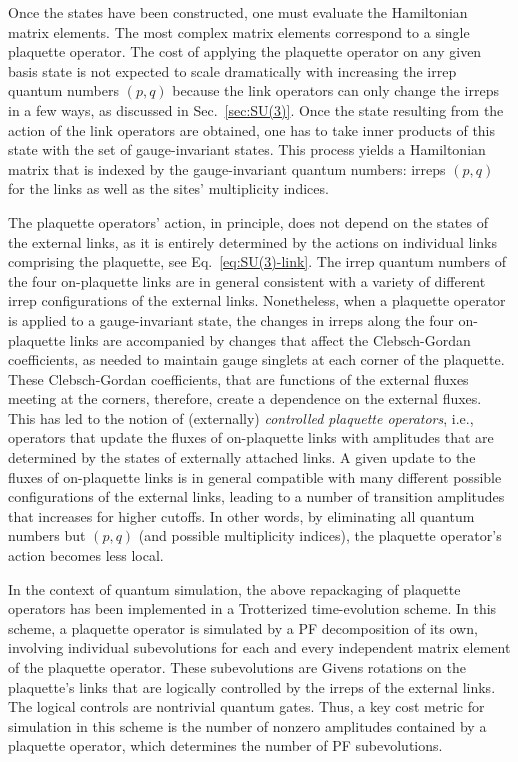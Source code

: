 \documentclass[aps,prd,twocolumn,showpacs,groupedaddress,superscriptaddress,nofootinbib,floatfix,preprintnumbers,longbibliography]{revtex4-1}
\begin{document}
Once the states have been constructed, one must evaluate the Hamiltonian matrix elements. The most complex matrix elements correspond to a single plaquette operator. The cost of applying the plaquette operator on any given basis state is not expected to scale dramatically with increasing the irrep quantum numbers $(p,q)$ because the link operators can only change the irreps in a few ways, as discussed in Sec.~\ref{sec:SU(3)}. Once the state resulting from the action of the link operators are obtained, one has to take inner products of this state with the set of gauge-invariant states. This process yields a Hamiltonian matrix that is indexed by the gauge-invariant quantum numbers: irreps $(p,q)$ for the links as well as the sites' multiplicity indices.

The plaquette operators' action, in principle, does not depend on the states of the external links, as it is entirely determined by the actions on individual links comprising the plaquette, see Eq.~\eqref{eq:SU(3)-link}. The irrep quantum numbers of the four on-plaquette links are in general consistent with a variety of different irrep configurations of the external links. Nonetheless, when a plaquette operator is applied to a gauge-invariant state, the changes in irreps along the four on-plaquette links are accompanied by changes that affect the Clebsch-Gordan coefficients, as needed to maintain gauge singlets at each corner of the plaquette. These Clebsch-Gordan coefficients, that are functions of the external fluxes meeting at the corners, therefore, create a dependence on the external fluxes. This has led to the notion of (externally) \emph{controlled plaquette operators}, i.e., operators that update the fluxes of on-plaquette links with amplitudes that are determined by the states of externally attached links. A given update to the fluxes of on-plaquette links is in general compatible with many different possible configurations of the external links, leading to a number of transition amplitudes that increases for higher cutoffs. In other words, by eliminating all quantum numbers but $(p,q)$ (and possible multiplicity indices), the plaquette operator's action becomes less local.

In the context of quantum simulation, the above repackaging of plaquette operators has been implemented in a Trotterized time-evolution scheme. In this scheme, a plaquette operator is simulated by a PF decomposition of its own, involving individual subevolutions for each and every independent matrix element of the plaquette operator. These subevolutions are Givens rotations on the plaquette's links that are logically controlled by the irreps of the external links. The logical controls are nontrivial quantum gates. Thus, a key cost metric for simulation in this scheme is the number of nonzero amplitudes contained by a plaquette operator, which determines the number of PF subevolutions.
\end{document}
